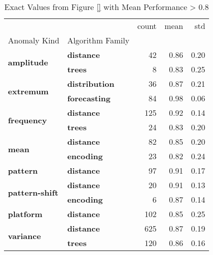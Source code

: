 \begin{table}
\caption{Exact Values from Figure \ref{} with Mean Performance > 0.8}
\label{tab:best-performer}
\begin{tabular}{llrrr}
\toprule
 &  & count & mean & std \\
Anomaly Kind & Algorithm Family &  &  &  \\
\midrule
\multirow[t]{2}{*}{\textbf{amplitude}} & \textbf{distance} & 42 & 0.86 & 0.20 \\
\textbf{} & \textbf{trees} & 8 & 0.83 & 0.25 \\
\cline{1-5}
\multirow[t]{2}{*}{\textbf{extremum}} & \textbf{distribution} & 36 & 0.87 & 0.21 \\
\textbf{} & \textbf{forecasting} & 84 & 0.98 & 0.06 \\
\cline{1-5}
\multirow[t]{2}{*}{\textbf{frequency}} & \textbf{distance} & 125 & 0.92 & 0.14 \\
\textbf{} & \textbf{trees} & 24 & 0.83 & 0.20 \\
\cline{1-5}
\multirow[t]{2}{*}{\textbf{mean}} & \textbf{distance} & 82 & 0.85 & 0.20 \\
\textbf{} & \textbf{encoding} & 23 & 0.82 & 0.24 \\
\cline{1-5}
\textbf{pattern} & \textbf{distance} & 97 & 0.91 & 0.17 \\
\cline{1-5}
\multirow[t]{2}{*}{\textbf{pattern-shift}} & \textbf{distance} & 20 & 0.91 & 0.13 \\
\textbf{} & \textbf{encoding} & 6 & 0.87 & 0.14 \\
\cline{1-5}
\textbf{platform} & \textbf{distance} & 102 & 0.85 & 0.25 \\
\cline{1-5}
\multirow[t]{2}{*}{\textbf{variance}} & \textbf{distance} & 625 & 0.87 & 0.19 \\
\textbf{} & \textbf{trees} & 120 & 0.86 & 0.16 \\
\cline{1-5}
\bottomrule
\end{tabular}
\end{table}
